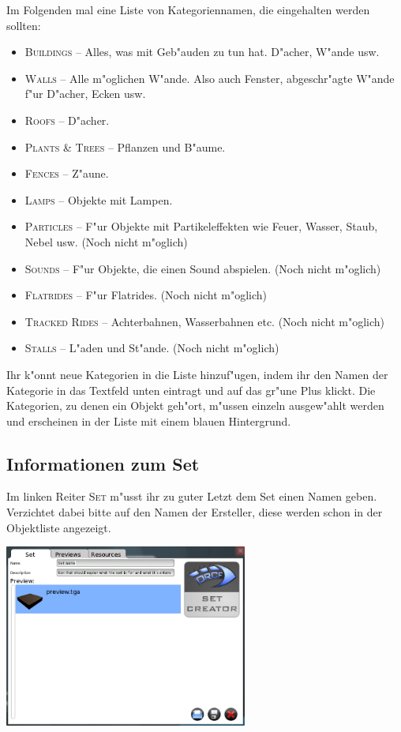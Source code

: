 \documentclass[a4paper]{article}
\newcommand{\ccaption}[1]{\textsc{#1}}
\begin{document}
Im Folgenden mal eine Liste von Kategoriennamen, die eingehalten werden sollten:
\begin{itemize}
\item \ccaption{Buildings} -- Alles, was mit Geb"auden zu tun hat. D"acher, W"ande usw.
\item \ccaption{Walls} -- Alle m"oglichen W"ande. Also auch Fenster, abgeschr"agte W"ande f"ur D"acher, Ecken usw.
\item \ccaption{Roofs} -- D"acher.
\item \ccaption{Plants \& Trees} -- Pflanzen und B"aume.
\item \ccaption{Fences} -- Z"aune.
\item \ccaption{Lamps} -- Objekte mit Lampen.
\item \ccaption{Particles} -- F"ur Objekte mit Partikeleffekten wie Feuer, Wasser, Staub, Nebel usw. (Noch nicht m"oglich)
\item \ccaption{Sounds} -- F"ur Objekte, die einen Sound abspielen. (Noch nicht m"oglich)
\item \ccaption{Flatrides} -- F"ur Flatrides. (Noch nicht m"oglich)
\item \ccaption{Tracked Rides} -- Achterbahnen, Wasserbahnen etc. (Noch nicht m"oglich)
\item \ccaption{Stalls} -- L"aden und St"ande. (Noch nicht m"oglich)
\end{itemize}

Ihr k"onnt neue Kategorien in die Liste hinzuf"ugen, indem ihr den Namen der Kategorie in das Textfeld unten eintragt und auf das gr"une Plus klickt.
Die Kategorien, zu denen ein Objekt geh"ort, m"ussen einzeln ausgew"ahlt werden und erscheinen in der Liste mit einem blauen Hintergrund.

\subsection{Informationen zum Set}
Im linken Reiter \ccaption{Set} m"usst ihr zu guter Letzt dem Set einen Namen geben. Verzichtet dabei bitte auf den Namen der Ersteller, diese werden
schon in der Objektliste angezeigt.
\begin{center}
\includegraphics[width=80mm]{../images/setcreator/set.png}
\end{center}
\end{document}
